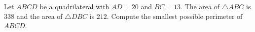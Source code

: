 Let $ABCD$ be a quadrilateral with $AD = 20$ and $BC = 13$.  The area of $\triangle ABC$ is $338$ and the area of $\triangle DBC$ is $212$.  Compute the smallest possible perimeter of $ABCD$.
